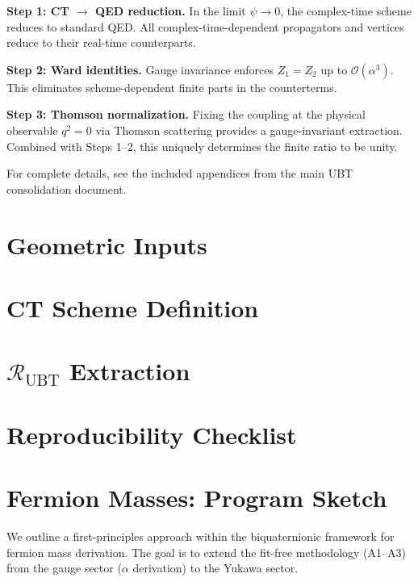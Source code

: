 \documentclass[11pt,a4paper]{article}
\begin{document}
\textbf{Step 1: CT $\to$ QED reduction.} In the limit $\psi \to 0$, the complex-time scheme reduces to standard QED. All complex-time-dependent propagators and vertices reduce to their real-time counterparts.

\textbf{Step 2: Ward identities.} Gauge invariance enforces $Z_1 = Z_2$ up to $\mathcal{O}(\alpha^3)$. This eliminates scheme-dependent finite parts in the counterterms.

\textbf{Step 3: Thomson normalization.} Fixing the coupling at the physical observable $q^2 = 0$ via Thomson scattering provides a gauge-invariant extraction. Combined with Steps 1--2, this uniquely determines the finite ratio to be unity.

For complete details, see the included appendices from the main UBT consolidation document.

\section{Geometric Inputs}



\section{CT Scheme Definition}



\section{$\mathcal{R}_{\mathrm{UBT}}$ Extraction}



\section{Reproducibility Checklist}



\section{Fermion Masses: Program Sketch}

We outline a first-principles approach within the biquaternionic framework for fermion mass derivation. The goal is to extend the fit-free methodology (A1--A3) from the gauge sector ($\alpha$ derivation) to the Yukawa sector.
\end{document}
